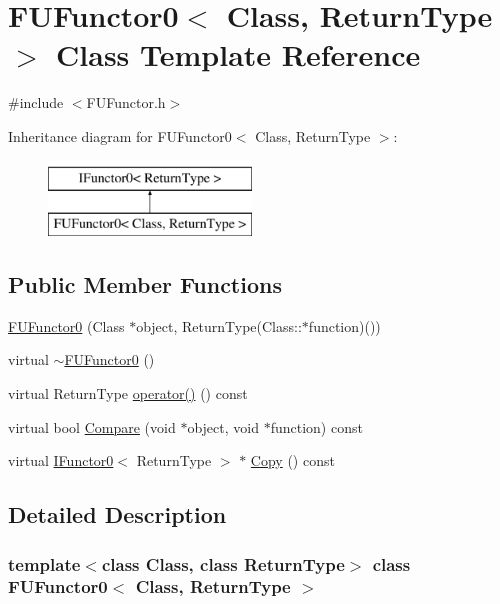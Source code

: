 \hypertarget{classFUFunctor0}{
\section{FUFunctor0$<$ Class, ReturnType $>$ Class Template Reference}
\label{classFUFunctor0}
}


{\ttfamily \#include $<$FUFunctor.h$>$}

Inheritance diagram for FUFunctor0$<$ Class, ReturnType $>$:\begin{figure}[H]
\begin{center}
\leavevmode
\includegraphics[height=2.000000cm]{classFUFunctor0}
\end{center}
\end{figure}
\subsection*{Public Member Functions}
\begin{DoxyCompactItemize}
\item 
\hyperlink{classFUFunctor0_afe195014cc52f8ae7bc69f45a562668a}{FUFunctor0} (Class $\ast$object, ReturnType(Class::$\ast$function)())
\item 
virtual \hyperlink{classFUFunctor0_a219c1cd90104c4394445728b56a555f0}{$\sim$FUFunctor0} ()
\item 
virtual ReturnType \hyperlink{classFUFunctor0_a5f9574b22edd5dd82f27f94d0f3d5123}{operator()} () const 
\item 
virtual bool \hyperlink{classFUFunctor0_aa099128bf31a2349c5f59510a5718d50}{Compare} (void $\ast$object, void $\ast$function) const 
\item 
virtual \hyperlink{classIFunctor0}{IFunctor0}$<$ ReturnType $>$ $\ast$ \hyperlink{classFUFunctor0_a6bab1ab360e9ea77435d514a173e3e10}{Copy} () const 
\end{DoxyCompactItemize}


\subsection{Detailed Description}
\subsubsection*{template$<$class Class, class ReturnType$>$ class FUFunctor0$<$ Class, ReturnType $>$}

